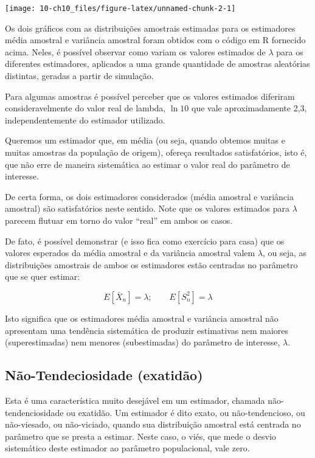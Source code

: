 \documentclass[
]{book}
\theoremstyle{definition}
\theoremstyle{definition}
\theoremstyle{definition}
\theoremstyle{remark}
\begin{document}
\texttt{[image: 10-ch10\_files/figure-latex/unnamed-chunk-2-1]}

Os dois gráficos com as distribuições amostrais estimadas para os estimadores média amostral e variância amostral foram obtidos com o código em R fornecido acima. Neles, é possível observar como variam os valores estimados de \(\lambda\) para os diferentes estimadores, aplicados a uma grande quantidade de amostras aleatórias distintas, geradas a partir de simulação.

Para algumas amostras é possível perceber que os valores estimados diferiram consideravelmente do valor real de lambda, \(\ln10\) que vale aproximadamente 2,3, independentemente do estimador utilizado.

Queremos um estimador que, em média (ou seja, quando obtemos muitas e muitas amostras da população de origem), ofereça resultados satisfatórios, isto é, que não erre de maneira sistemática ao estimar o valor real do parâmetro de interesse.

De certa forma, os dois estimadores considerados (média amostral e variância amostral) são satisfatórios neste sentido. Note que os valores estimados para \(\lambda\) parecem flutuar em torno do valor ``real'' em ambos os casos.

De fato, é possível demonstrar (e isso fica como exercício para casa) que
os valores esperados da média amostral e da variância amostral valem \(\lambda\), ou seja, as distribuições amostrais de ambos os estimadores estão centradas no parâmetro que se quer estimar:

\[E[\bar{X}_n]=\lambda; \qquad E[S^2_n]=\lambda\]

Isto significa que os estimadores média amostral e variância amostral não apresentam uma tendência sistemática de produzir estimativas nem maiores (superestimadas) nem menores (subestimadas) do parâmetro de interesse, \(\lambda\).

\hypertarget{nuxe3o-tendeciosidade-exatiduxe3o}{%
\subsection*{Não-Tendeciosidade (exatidão)}\label{nuxe3o-tendeciosidade-exatiduxe3o}}

Esta é uma característica muito desejável em um estimador, chamada não-tendenciosidade ou exatidão.
Um estimador é dito exato, ou não-tendencioso, ou não-viesado, ou não-viciado, quando sua distribuição amostral está centrada no parâmetro que se presta a estimar. Neste caso, o viés, que mede o desvio sistemático deste estimador ao parâmetro populacional, vale zero.
\end{document}
